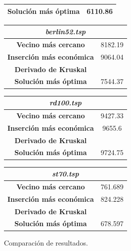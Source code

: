 \documentclass[12pt,spanish]{article}
\begin{document}
\begin{figure}[H]
\begin{tabular}{|c|c|}
\textbf{Solución más óptima} & 6110.86\\
\hline	
\end{tabular}
\vspace{0.5cm}
\quad
\begin{tabular}{|c|c|}
\hline	
\multicolumn{2}{|c|}{\textit{berlin52.tsp}}\\
\hline
\textbf{Vecino más cercano} & 8182.19\\
\textbf{Inserción más económica} & 9064.04\\
\textbf{Derivado de Kruskal} & \\
\textbf{Solución más óptima} & 7544.37\\
\hline	
\end{tabular}
\vspace{0.5cm}
\quad
\begin{tabular}{|c|c|}
\hline	
\multicolumn{2}{|c|}{\textit{rd100.tsp}}\\
\hline
\textbf{Vecino más cercano} & 9427.33\\
\textbf{Inserción más económica} & 9655.6\\
\textbf{Derivado de Kruskal} & \\
\textbf{Solución más óptima} & 9724.75\\
\hline	
\end{tabular}
\vspace{0.5cm}
\quad
\begin{tabular}{|c|c|}
\hline	
\multicolumn{2}{|c|}{\textit{st70.tsp}}\\
\hline
\textbf{Vecino más cercano} & 761.689\\
\textbf{Inserción más económica} & 824.228\\
\textbf{Derivado de Kruskal} & \\
\textbf{Solución más óptima} & 678.597 \\
\hline	
\end{tabular}
\caption{Comparación de resultados.}
\end{figure}
\end{document}

